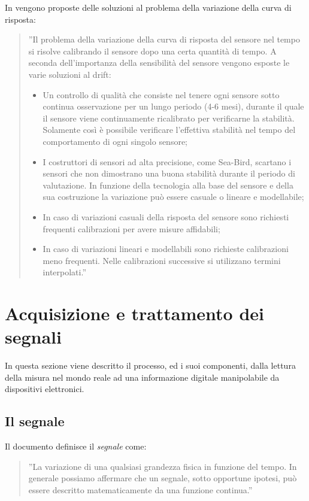 \documentclass[a4paper]{report} %
\begin{document}
In \cite{art:rif.15} vengono proposte delle soluzioni al problema della variazione della curva di risposta:
\begin{quote}
	''Il problema della variazione della curva di risposta del sensore nel tempo si risolve calibrando il sensore dopo una certa quantità di tempo. A seconda dell'importanza della sensibilità del sensore vengono esposte le varie soluzioni al drift:
	\begin{itemize}
		\item Un controllo di qualità che consiste nel tenere ogni sensore sotto continua osservazione per un lungo periodo (4-6 mesi), durante il quale il sensore viene continuamente ricalibrato per verificarne la stabilità. Solamente così è possibile verificare l'effettiva stabilità nel tempo del comportamento di ogni singolo sensore;
		\item I costruttori di sensori ad alta precisione, come Sea-Bird, scartano i sensori che non dimostrano una buona stabilità durante il periodo di valutazione. In funzione della tecnologia alla base del sensore e della sua costruzione la variazione può essere casuale o lineare e modellabile;
		\item In caso di variazioni casuali della risposta del sensore sono richiesti frequenti calibrazioni per avere misure affidabili;
		\item In caso di variazioni lineari e modellabili sono richieste calibrazioni meno frequenti. Nelle calibrazioni successive si utilizzano termini interpolati.''  
	\end{itemize}
\end{quote}

\section{Acquisizione e trattamento dei segnali}
In questa sezione viene descritto il processo, ed i suoi componenti, dalla lettura della misura nel mondo reale ad una informazione digitale manipolabile da dispositivi elettronici.

\subsection{Il segnale}

Il documento \cite{art:rif.2} definisce il \textit{segnale} come:
\begin{quote}
	''La variazione di una qualsiasi grandezza fisica in funzione del tempo. In generale possiamo affermare che un segnale, sotto opportune ipotesi, può essere descritto matematicamente da una funzione continua.''
\end{quote}
\end{document}
